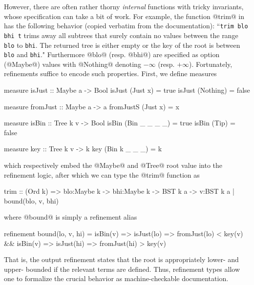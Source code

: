However, there are often rather thorny \emph{internal} functions with tricky
invariants, whose specification can take a bit of work. For example, the
function @trim@ in {\benchMap} has the following behavior (copied verbatim
from the documentation):
``\verb-trim blo bhi t- trims away all subtrees that surely
  contain no values between the range \verb-blo- to \verb-bhi-. 
   The returned tree is either empty or the key of the 
   root is between \verb-blo- and \verb-bhi-."
Furthermore @blo@ (resp. @bhi@) are specified as option 
(\ie @Maybe@) values with @Nothing@ denoting $-\infty$ (resp. $+\infty$). 
%
Fortunately, refinements suffice to encode such properties. 
First, we define measures
%
\begin{code}
  measure isJust     :: Maybe a -> Bool 
  isJust (Just x)    = true
  isJust (Nothing)   = false

  measure fromJust   :: Maybe a -> a 
  fromJustS (Just x) = x 

  measure isBin       :: Tree k v -> Bool
  isBin (Bin _ _ _ _) = true
  isBin (Tip)         = false

  measure key :: Tree k v -> k 
  key (Bin k _ _ _)   = k 
\end{code}
%
which respectively embed the @Maybe@ and @Tree@ root value into the
refinement logic, after which we can type the @trim@ function as
\begin{code}
  trim :: (Ord k) => blo:Maybe k 
                  -> bhi:Maybe k 
                  -> BST k a 
                  -> {v:BST k a | bound(blo, v, bhi)}
\end{code}
where @bound@ is simply a refinement alias
\begin{code}
  refinement bound(lo, v, hi) 
    =  isBin(v) => isJust(lo) => fromJust(lo) < key(v) 
    &&  isBin(v) => isJust(hi) => fromJust(hi) > key(v)
\end{code}
That is, the output refinement states that the root is appropriately 
lower- and upper- bounded if the relevant terms are defined. 
Thus, refinement types allow one to formalize the crucial behavior as
machine-checkable documentation.

